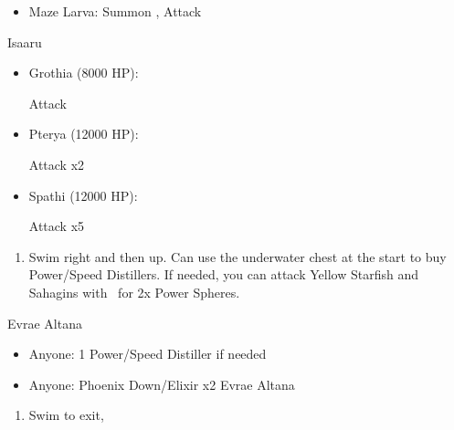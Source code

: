 \begin{encounters}
	\begin{itemize}
		\item Maze Larva: Summon \ixion, Attack
	\end{itemize}
\end{encounters}
\bothvfill
\winvfill
\lossvfill
\begin{battle}{Isaaru}
	\begin{itemize}
		\item Grothia (8000 HP):
		      \begin{itemize}
			      \summon{\bahamut}
			      \bahamutf Attack
		      \end{itemize}
		\item Pterya (12000 HP):
		      \begin{itemize}
			      \summon{\bahamut}
			      \bahamutf Attack x2
		      \end{itemize}
		\item Spathi (12000 HP):
		      \begin{itemize}
			      \summon{\ixion}
			      \ixionf Attack x5
		      \end{itemize}
	\end{itemize}
\end{battle}
\begin{enumerate}[resume]
	\item Swim right and then up. Can use the underwater chest at the start to buy Power/Speed Distillers. If needed, you can attack Yellow Starfish and Sahagins with \tidus\ for 2x Power Spheres.
\end{enumerate}
\begin{battle}{Evrae Altana}
	\begin{itemize}
		\item Anyone: 1 Power/Speed Distiller if needed
		\item Anyone: Phoenix Down/Elixir x2 Evrae Altana
	\end{itemize}
\end{battle}
\begin{enumerate}[resume]
	\item Swim to exit, \sd
\end{enumerate}
\ 
\bothvfill
\ \bothnewline
\bothcb
\ 